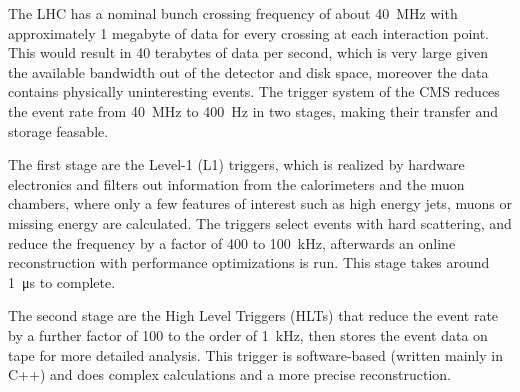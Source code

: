 The LHC has a nominal bunch crossing frequency of about \SI{40}{MHz} with approximately 1 megabyte of data for every crossing at each interaction point. This would result in 40 terabytes of data per second, which is very large given the available bandwidth out of the detector and disk space, moreover the data contains physically uninteresting events. The trigger system of the CMS reduces the event rate from \SI{40}{MHz} to \SI{400}{Hz} in two stages, making their transfer and storage feasable.

The first stage are the Level-1 (L1) triggers, which is realized by hardware electronics and filters out information from the calorimeters and the muon chambers, where only a few features of interest such as high energy jets, muons or missing energy are calculated. The triggers select events with hard scattering, and reduce the frequency by a factor of 400 to \SI{100}{kHz}, afterwards an online reconstruction with performance optimizations is run. This stage takes around \SI{1}{\micro s} to complete.

The second stage are the High Level Triggers (HLTs) that reduce the event rate by a further factor of 100 to the order of \SI{1}{kHz}, then stores the event data on tape for more detailed analysis. This trigger is software-based (written mainly in C++) and does complex calculations and a more precise reconstruction.